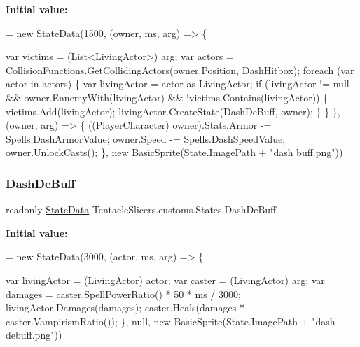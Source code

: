 {\bfseries Initial value\+:}
\begin{DoxyCode}
= \textcolor{keyword}{new} StateData(1500, (owner, ms, arg) =>
        \{
            
            var victims = (List<LivingActor>) arg;
            var actors = CollisionFunctions.GetCollidingActors(owner.Position, DashHitbox);
            \textcolor{keywordflow}{foreach} (var actor \textcolor{keywordflow}{in} actors)
            \{
                var livingActor = actor as LivingActor;
                \textcolor{keywordflow}{if} (livingActor != null && owner.EnnemyWith(livingActor) && !victims.Contains(livingActor))
                \{
                    victims.Add(livingActor);
                    livingActor.CreateState(DashDeBuff, owner);
                \}
            \}
        \}, (owner, arg) =>
        \{
            ((PlayerCharacter) owner).Stats.Armor -= Spells.DashArmorValue;
            owner.Speed -= Spells.DashSpeedValue;
            owner.UnlockCasts();
        \}, \textcolor{keyword}{new} BasicSprite(State.ImagePath + \textcolor{stringliteral}{"dash buff.png"}))
\end{DoxyCode}
\mbox{\label{class_tentacle_slicers_1_1customs_1_1_states_a6d1c3393e9ecc3b721268306c2db6ec8}} 
\subsubsection{\texorpdfstring{Dash\+De\+Buff}{DashDeBuff}}
{\footnotesize\ttfamily readonly \hyperlink{class_tentacle_slicers_1_1states_1_1_state_data}{State\+Data} Tentacle\+Slicers.\+customs.\+States.\+Dash\+De\+Buff\hspace{0.3cm}{\ttfamily [static]}}

{\bfseries Initial value\+:}
\begin{DoxyCode}
= \textcolor{keyword}{new} StateData(3000, (actor, ms, arg) =>
        \{
            
            var livingActor = (LivingActor) actor;
            var caster = (LivingActor) arg;
            var damages = caster.SpellPowerRatio() * 50 * ms / 3000;
            livingActor.Damages(damages);
            caster.Heals(damages * caster.VampirismRatio());
        \}, null, \textcolor{keyword}{new} BasicSprite(State.ImagePath + \textcolor{stringliteral}{"dash debuff.png"}))
\end{DoxyCode}
\mbox{\label{class_tentacle_slicers_1_1customs_1_1_states_aaf1dacbd0e97e31892c31b08b3417294}} 
